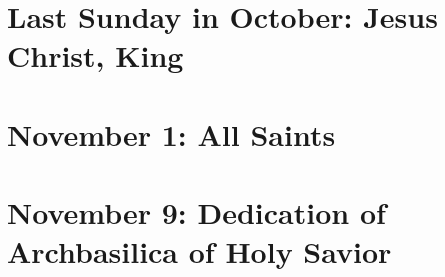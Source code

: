 {{\section{Last Sunday in October: Jesus Christ, King}
\subtitle{ Class}
\subtitle{II Vespers}

\def\definevesperspropers{
  \def\prepsalmfive{\greseteolcustos{manual}}
}
\def\premagverses{\greseteolcustos{manual}}
\def\beginchaptercols{\begin{parcolumns}[rulebetween,colwidths={1=0.46\linewidth}]{2}}

\bigskip
\benedicamusdomino{}
}

{
\section{November 1: All Saints}
\subtitle{ Class}
\subtitle{I \& II Vespers}

\def\definevesperspropers{
  \def\prepsalmfive{\greseteolcustos{manual}}
}
\def\definevesperspropersalt{}
\def\vesperspropersnote{At II Vespers:}
\def\vesperspropersaltnote{At I Vespers:}
\def\premagverses{\greseteolcustos{manual}}

\bigskip
\benedicamusdomino{}
}

{
\section{November 9: Dedication of Archbasilica of Holy Savior}
\subtitle{ Class}
\subtitle{I \& II Vespers}

\def\definevesperspropers{
  \def\prepsalmfive{\greseteolcustos{manual}}
}
\def\definevesperspropersalt{}
\def\vesperspropersnote{At II Vespers:}
\def\vesperspropersaltnote{At I Vespers:}
\def\premagverses{\greseteolcustos{manual}}

\bigskip
\benedicamusdomino{}
}

}
